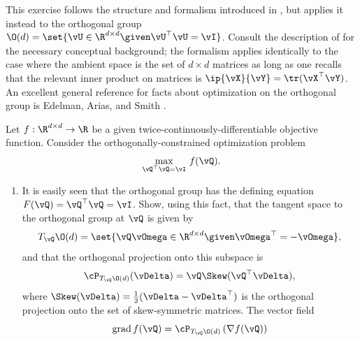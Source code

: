 \documentclass[../../book-main.tex]{subfiles}
\begin{document}
\begin{exercise}\label{exercise:orthogonal-group-calculus}
    This exercise follows the structure and formalism introduced in
    , but applies it instead to the
    orthogonal group $\O(d) = \set{\vU \in \R^{d \times d} \given
    \vU^\top \vU = \vI}$.
    Consult the description of  for
    the necessary conceptual background; the formalism applies
    identically to the case where the ambient space is the set of $d
    \times d$ matrices as long as one recalls that the relevant inner
    product on matrices is $\ip{\vX}{\vY} = \tr(\vX^\top \vY)$.
    An excellent general reference for facts about optimization on
    the orthogonal group is Edelman, Arias, and Smith \cite{Edelman1998-lg}.

    Let $f : \R^{d\times d} \to \R$ be a given
    twice-continuously-differentiable objective function. Consider
    the orthogonally-constrained optimization problem
    \begin{equation}\label{eq:exercise-orthogonal-group-constrained-max}
        \max_{\vQ^\top \vQ = \vI}\, f(\vQ).
    \end{equation}
    \begin{enumerate}
        \item  It is easily seen that the orthogonal group has the
            defining equation $F(\vQ) = \vQ^\top \vQ = \vI$.
            Show, using this fact, that the tangent space to the
            orthogonal group at $\vQ$ is given by
            \begin{equation*}
                T_{\vQ} \O(d) = \set{\vQ \vOmega \in \R^{d\times d}
                \given \vOmega^\top = - \vOmega},
            \end{equation*}
            and that the orthogonal projection onto this subspace is
            \begin{equation*}
                \cP_{T_{\vQ}\O(d)}(\vDelta) =  \vQ \Skew(\vQ^\top \vDelta),
            \end{equation*}
            where $\Skew(\vDelta) = \tfrac{1}{2} ( \vDelta -
            \vDelta^\top)$ is the orthogonal projection onto the set
            of skew-symmetric matrices.
            The vector field
            \begin{equation}\label{eq:exercise-riemann-grad-orthogonal-group}
                \mathrm{grad}\, f(\vQ) = \cP_{T_{\vQ} \O(d)} \left(
                \nabla f(\vQ) \right)
            \end{equation}

\end{enumerate}
\end{exercise}
\end{document}
